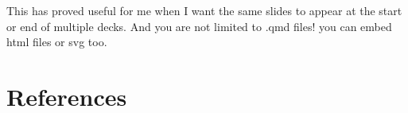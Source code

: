\documentclass[
  letterpaper,
  DIV=11,
  numbers=noendperiod]{scrreprt}
\newlength{\cslhangindent}
\newenvironment{CSLReferences}[2] %
 {\begin{list}{}{%
  \setlength{\itemindent}{0pt}
  \setlength{\leftmargin}{0pt}
  \setlength{\parsep}{0pt}
  \ifodd #1
   \setlength{\leftmargin}{\cslhangindent}
   \setlength{\itemindent}{-1\cslhangindent}
  \fi
  \setlength{\itemsep}{#2\baselineskip}}}
 {\end{list}}
\begin{document}
This has proved useful for me when I want the same slides to appear at
the start or end of multiple decks. And you are not limited to .qmd
files! you can embed html files or svg too.


\chapter*{References}\label{references}


\label{refs}
\begin{CSLReferences}{0}{1}
\end{CSLReferences}
\end{document}
